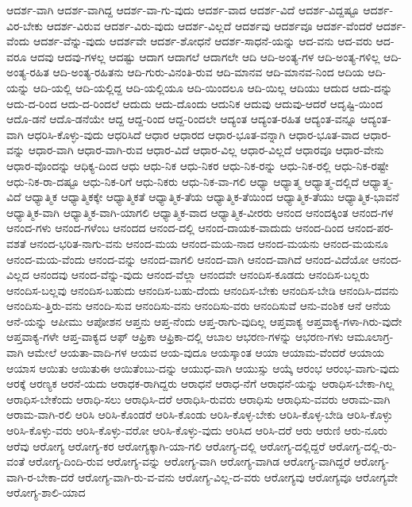 {ಆದರ್ಶ-ವಾಗಿ
ಆದರ್ಶ-ವಾಗಿದ್ದ
ಆದರ್ಶ-ವಾ-ಗು-ವುದು
ಆದರ್ಶ-ವಾದ
ಆದರ್ಶ-ವಿದೆ
ಆದರ್ಶ-ವಿದ್ದಷ್ಟೂ
ಆದರ್ಶ-ವಿರ-ಬೇಕು
ಆದರ್ಶ-ವಿರುವ
ಆದರ್ಶ-ವಿರು-ವುದು
ಆದರ್ಶ-ವಿಲ್ಲದೆ
ಆದರ್ಶವು
ಆದರ್ಶವೂ
ಆದರ್ಶ-ವೆಂದರೆ
ಆದರ್ಶ-ವೆಂದು
ಆದರ್ಶ-ವೆನ್ನು-ವುದು
ಆದರ್ಶವೇ
ಆದರ್ಶ-ಶೋಧನೆ
ಆದರ್ಶ-ಸಾಧನೆ-ಯನ್ನು
ಆದ-ವನು
ಆದ-ವರು
ಆದ-ವರೂ
ಆದವು
ಆದವು-ಗಳಲ್ಲ
ಆದಷ್ಟು
ಆದಾಗ
ಆದಾಗಲೆ
ಆದಾಗಲೇ
ಆದಿ
ಆದಿ-ಅಂತ್ಯ-ಗಳ
ಆದಿ-ಅಂತ್ಯ-ಗಳಿಲ್ಲ
ಆದಿ-ಅಂತ್ಯ-ರಹಿತ
ಆದಿ-ಅಂತ್ಯ-ರಹಿತನು
ಆದಿ-ಗುರು-ವಿನಂತಿ-ರುವ
ಆದಿ-ಮಾನವ
ಆದಿ-ಮಾನವ-ನಿಂದ
ಆದಿಯ
ಆದಿ-ಯನ್ನು
ಆದಿ-ಯಲ್ಲಿ
ಆದಿ-ಯಲ್ಲಿದ್ದ
ಆದಿ-ಯಲ್ಲಿಯೂ
ಆದಿ-ಯಿಂದಲೂ
ಆದಿ-ಯಿಲ್ಲ
ಆದಿಯು
ಆದುದ
ಆದು-ದನ್ನು
ಆದು-ದ-ರಿಂದ
ಆದು-ದ-ರಿಂದಲೆ
ಆದುದು
ಆದು-ದೊಂದು
ಆದುನಿಕ
ಆದುವು
ಆದುವು-ಆದರೆ
ಆದೃಷ್ಟಿ-ಯಿಂದ
ಆದೊ-ಡನೆ
ಆದೊ-ಡನೆಯೇ
ಆದ್ದ
ಆದ್ದ-ರಿಂದ
ಆದ್ದ-ರಿಂದಲೇ
ಆದ್ಯಂತ
ಆದ್ಯಂತ-ರಹಿತ
ಆದ್ಯಂತ-ವನ್ನೂ
ಆದ್ಯಂತ-ವಾಗಿ
ಆಧರಿಸಿ-ಕೊಳ್ಳು-ವುದು
ಆಧರಿಸಿದೆ
ಆಧಾರ
ಆಧಾರದ
ಆಧಾರ-ಭೂತ-ವನ್ನಾಗಿ
ಆಧಾರ-ಭೂತ-ವಾದ
ಆಧಾರ-ವನ್ನು
ಆಧಾರ-ವಾಗಿ
ಆಧಾರ-ವಾಗಿ-ರುವ
ಆಧಾರ-ವಿದೆ
ಆಧಾರ-ವಿಲ್ಲ
ಆಧಾರ-ವಿಲ್ಲದೆ
ಆಧಾರವೂ
ಆಧಾರ-ವೇನು
ಆಧಾರ-ವೊಂದನ್ನು
ಆಧಿಕ್ಯ-ದಿಂದ
ಆಧು
ಆಧು-ನಿಕ
ಆಧು-ನಿಕರ
ಆಧು-ನಿಕ-ರನ್ನು
ಆಧು-ನಿಕ-ರಲ್ಲಿ
ಆಧು-ನಿಕ-ರಷ್ಟೇ
ಆಧು-ನಿಕ-ರಾ-ದಷ್ಟೂ
ಆಧು-ನಿಕ-ರಿಗೆ
ಆಧು-ನಿಕರು
ಆಧು-ನಿಕ-ವಾ-ಗಲಿ
ಆಧ್ಯಾ
ಆಧ್ಯಾತ್ಮ
ಆಧ್ಯಾತ್ಮ-ದಲ್ಲಿದೆ
ಆಧ್ಯಾತ್ಮ-ವಿದೆ
ಆಧ್ಯಾತ್ಮಿಕ
ಆಧ್ಯಾತ್ಮಿಕಕ್ಕೇ
ಆಧ್ಯಾತ್ಮಿಕತೆ
ಆಧ್ಯಾತ್ಮಿಕ-ತೆಯ
ಆಧ್ಯಾತ್ಮಿಕ-ತೆಯಿಂದ
ಆಧ್ಯಾತ್ಮಿಕ-ತೆಯು
ಆಧ್ಯಾತ್ಮಿಕ-ಭಾವನೆ
ಆಧ್ಯಾತ್ಮಿಕ-ವಾಗಿ
ಆಧ್ಯಾತ್ಮಿಕ-ವಾಗಿ-ಯಾಗಲಿ
ಆಧ್ಯಾತ್ಮಿಕ-ವಾದ
ಆಧ್ಯಾತ್ಮಿಕ-ವೀರರು
ಆನಂದ
ಆನಂದಕ್ಕಿಂತ
ಆನಂದ-ಗಳ
ಆನಂದ-ಗಳು
ಆನಂದ-ಗಳೆಂಬ
ಆನಂದದ
ಆನಂದ-ದಲ್ಲಿ
ಆನಂದ-ದಾಯಕ-ವಾದುದು
ಆನಂದ-ದಿಂದ
ಆನಂದ-ಪರ-ವಶತೆ
ಆನಂದ-ಭರಿತ-ನಾಗು-ವನು
ಆನಂದ-ಮಯ
ಆನಂದ-ಮಯ-ನಾದ
ಆನಂದ-ಮಯನು
ಆನಂದ-ಮಯನೂ
ಆನಂದ-ಮಯ-ವೆಂದು
ಆನಂದ-ವನ್ನು
ಆನಂದ-ವಾಗಲಿ
ಆನಂದ-ವಾಗಿ
ಆನಂದ-ವಾಗಿದೆ
ಆನಂದ-ವಿದೆಯೋ
ಆನಂದ-ವಿಲ್ಲದ
ಆನಂದವು
ಆನಂದ-ವೆನ್ನು-ವುದು
ಆನಂದ-ವೆಲ್ಲಾ
ಆನಂದವೇ
ಆನಂದಿಸ-ಕೂಡದು
ಆನಂದಿಸ-ಬಲ್ಲರು
ಆನಂದಿಸ-ಬಲ್ಲವು
ಆನಂದಿಸ-ಬಹುದು
ಆನಂದಿಸ-ಬಹು-ದೆಂದು
ಆನಂದಿಸ-ಬೇಕು
ಆನಂದಿಸ-ಬೇಡಿ
ಆನಂದಿಸಿ-ದವನು
ಆನಂದಿಸು-ತ್ತಿರು-ವನು
ಆನಂದಿ-ಸುವ
ಆನಂದಿಸು-ವನು
ಆನಂದಿಸು-ವರು
ಆನಂದಿಸುವೆ
ಆನು-ವಂಶಿಕ
ಆನೆ
ಆನೆಯ
ಆನೆ-ಯನ್ನು
ಆಪೀಮು
ಆಪೋಶನ
ಆಪ್ತನು
ಆಪ್ತ-ನೆಂದು
ಆಪ್ತ-ರಾಗು-ವುದಿಲ್ಲ
ಆಪ್ತವಾಕ್ಯ
ಆಪ್ತವಾಕ್ಯ-ಗಳಾ-ಗಿರು-ವುದೇ
ಆಪ್ತವಾಕ್ಯ-ಗಳೇ
ಆಪ್ತ-ವಾಕ್ಯದ
ಆಫ್
ಆಫ್ರಿಕಾ
ಆಫ್ರಿಕಾ-ದಲ್ಲಿ
ಆಬಾಲ
ಆಭರಣ-ಗಳನ್ನು
ಆಭರಣ-ಗಳು
ಆಮೂಲಾಗ್ರ-ವಾಗಿ
ಆಮೇಲೆ
ಆಯತಾ-ವಾದಿ-ಗಳ
ಆಯವ
ಆಯ-ವುದೂ
ಆಯಸ್ಕಾಂತ
ಆಯಾ
ಆಯಾಮ-ವೆಂದರೆ
ಆಯಾಯ
ಆಯಾಸ
ಆಯಿತು
ಆಯಿತುಈ
ಆಯಿತೆಂಬು-ದನ್ನು
ಆಯುಧ-ವಾಗಿ
ಆಯುಸ್ಸು
ಆಯ್ಕೆ
ಆರಂಭ
ಆರಂಭ-ವಾಗು-ವುದು
ಆರಕ್ಕೆ
ಆರಣ್ಯಕ
ಆರನೆ-ಯದು
ಆರಾಧಕ-ರಾಗಿದ್ದರು
ಆರಾಧನೆ
ಆರಾಧ-ನೆಗೆ
ಆರಾಧನೆ-ಯನ್ನು
ಆರಾಧಿಸ-ಬೇಕಾ-ಗಿಲ್ಲ
ಆರಾಧಿಸ-ಬೇಕೆಂದು
ಆರಾಧಿ-ಸಲು
ಆರಾಧಿಸಿ-ದರೆ
ಆರಾಧಿಸಿ-ರುವರು
ಆರಾಧಿಸು
ಆರಾಧಿಸು-ವವರು
ಆರಾಮ-ವಾಗಿ
ಆರಾಮ-ವಾಗಿ-ರಲಿ
ಆರಿಸಿ
ಆರಿಸಿ-ಕೊಂಡರೆ
ಆರಿಸಿ-ಕೊಂಡು
ಆರಿಸಿ-ಕೊಳ್ಳ-ಬೇಕು
ಆರಿಸಿ-ಕೊಳ್ಳ-ಬೇಡಿ
ಆರಿಸಿ-ಕೊಳ್ಳು
ಆರಿಸಿ-ಕೊಳ್ಳು-ವರು
ಆರಿಸಿ-ಕೊಳ್ಳು-ವರೋ
ಆರಿಸಿ-ಕೊಳ್ಳು-ವುದು
ಆರಿಸಿದ
ಆರಿಸಿ-ದರೆ
ಆರು
ಆರುಣಿ
ಆರು-ನೂರು
ಆರೆವು
ಆರೋಗ್ಯ
ಆರೋಗ್ಯ-ಕರ
ಆರೋಗ್ಯಕ್ಕಾಗಿ-ಯಾ-ಗಲಿ
ಆರೋಗ್ಯ-ದಲ್ಲಿ
ಆರೋಗ್ಯ-ದಲ್ಲಿದ್ದರೆ
ಆರೋಗ್ಯ-ದಲ್ಲಿ-ರು-ವಂತೆ
ಆರೋಗ್ಯ-ದಿಂದಿ-ರುವ
ಆರೋಗ್ಯ-ವನ್ನು
ಆರೋಗ್ಯ-ವಾಗಿ
ಆರೋಗ್ಯ-ವಾಗಿಡ
ಆರೋಗ್ಯ-ವಾಗಿದ್ದರೆ
ಆರೋಗ್ಯ-ವಾಗಿ-ರ-ಬೇಕಾ-ದರೆ
ಆರೋಗ್ಯ-ವಾಗಿ-ರು-ವ-ವನು
ಆರೋಗ್ಯ-ವಿಲ್ಲ-ದ-ವರು
ಆರೋಗ್ಯವು
ಆರೋಗ್ಯವೂ
ಆರೋಗ್ಯವೇ
ಆರೋಗ್ಯ-ಶಾಲಿ-ಯಾದ
}
